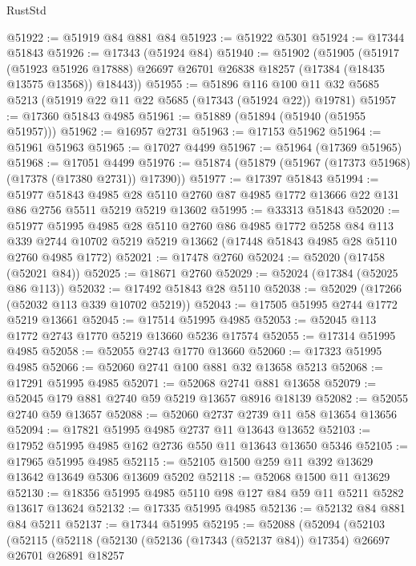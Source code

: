 \begin{lexlean}{RustStd}
\begin{coremodule}
@51922 := @51919 @84 @881 @84
@51923 := @51922 @5301
@51924 := @17344 @51843
@51926 := @17343 (@51924 @84)
@51940 := @51902
    (@51905
      (@51917
        (@51923 @51926 @17888)
        @26697
        @26701
        @26838
        @18257
        (@17384 (@18435 @13575 @13568))
        @18443))
@51955 := @51896
    @116
    @100
    @11
    @32
    @5685
    @5213
    (@51919 @22 @11 @22 @5685 (@17343 (@51924 @22)) @19781)
@51957 := @17360 @51843 @4985
@51961 := @51889 (@51894 (@51940 (@51955 @51957)))
@51962 := @16957 @2731
@51963 := @17153 @51962
@51964 := @51961 @51963
@51965 := @17027 @4499
@51967 := @51964 (@17369 @51965)
@51968 := @17051 @4499
@51976 := @51874 (@51879 (@51967 (@17373 @51968) (@17378 (@17380 @2731)) @17390))
@51977 := @17397 @51843
@51994 := @51977
    @51843
    @4985
    @28
    @5110
    @2760
    @87
    @4985
    @1772
    @13666
    @22
    @131
    @86
    @2756
    @5511
    @5219
    @5219
    @13602
@51995 := @33313 @51843
@52020 := @51977
    @51995
    @4985
    @28
    @5110
    @2760
    @86
    @4985
    @1772
    @5258
    @84
    @113
    @339
    @2744
    @10702
    @5219
    @5219
    @13662
    (@17448 @51843 @4985 @28 @5110 @2760 @4985 @1772)
@52021 := @17478 @2760
@52024 := @52020 (@17458 (@52021 @84))
@52025 := @18671 @2760
@52029 := @52024 (@17384 (@52025 @86 @113))
@52032 := @17492 @51843 @28 @5110
@52038 := @52029 (@17266 (@52032 @113 @339 @10702 @5219))
@52043 := @17505 @51995 @2744 @1772 @5219 @13661
@52045 := @17514 @51995 @4985
@52053 := @52045 @113 @1772 @2743 @1770 @5219 @13660 @5236 @17574
@52055 := @17314 @51995 @4985
@52058 := @52055 @2743 @1770 @13660
@52060 := @17323 @51995 @4985
@52066 := @52060 @2741 @100 @881 @32 @13658 @5213
@52068 := @17291 @51995 @4985
@52071 := @52068 @2741 @881 @13658
@52079 := @52045 @179 @881 @2740 @59 @5219 @13657 @8916 @18139
@52082 := @52055 @2740 @59 @13657
@52088 := @52060 @2737 @2739 @11 @58 @13654 @13656
@52094 := @17821 @51995 @4985 @2737 @11 @13643 @13652
@52103 := @17952 @51995 @4985 @162 @2736 @550 @11 @13643 @13650 @5346
@52105 := @17965 @51995 @4985
@52115 := @52105 @1500 @259 @11 @392 @13629 @13642 @13649 @5306 @13609 @5202
@52118 := @52068 @1500 @11 @13629
@52130 := @18356 @51995 @4985 @5110 @98 @127 @84 @59 @11 @5211 @5282 @13617 @13624
@52132 := @17335 @51995 @4985
@52136 := @52132 @84 @881 @84 @5211
@52137 := @17344 @51995
@52195 := @52088
    (@52094
      (@52103
        (@52115
          (@52118
            (@52130
              (@52136 (@17343 (@52137 @84)) @17354)
              @26697
              @26701
              @26891
              @18257

\end{coremodule}
\end{lexlean}
